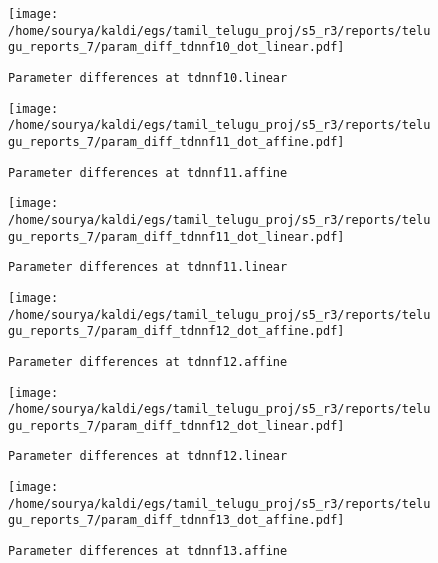 \documentclass[prl,10pt,twocolumn]{revtex4}
\begin{document}
\newpage
\begin{figure}[h]
  \begin{center}
    \caption{\texttt{Parameter differences at tdnnf10.linear}}
    \texttt{[image: /home/sourya/kaldi/egs/tamil\_telugu\_proj/s5\_r3/reports/telugu\_reports\_7/param\_diff\_tdnnf10\_dot\_linear.pdf]}
  \end{center}
\end{figure}
\clearpage


\newpage
\begin{figure}[h]
  \begin{center}
    \caption{\texttt{Parameter differences at tdnnf11.affine}}
    \texttt{[image: /home/sourya/kaldi/egs/tamil\_telugu\_proj/s5\_r3/reports/telugu\_reports\_7/param\_diff\_tdnnf11\_dot\_affine.pdf]}
  \end{center}
\end{figure}
\clearpage


\newpage
\begin{figure}[h]
  \begin{center}
    \caption{\texttt{Parameter differences at tdnnf11.linear}}
    \texttt{[image: /home/sourya/kaldi/egs/tamil\_telugu\_proj/s5\_r3/reports/telugu\_reports\_7/param\_diff\_tdnnf11\_dot\_linear.pdf]}
  \end{center}
\end{figure}
\clearpage


\newpage
\begin{figure}[h]
  \begin{center}
    \caption{\texttt{Parameter differences at tdnnf12.affine}}
    \texttt{[image: /home/sourya/kaldi/egs/tamil\_telugu\_proj/s5\_r3/reports/telugu\_reports\_7/param\_diff\_tdnnf12\_dot\_affine.pdf]}
  \end{center}
\end{figure}
\clearpage


\newpage
\begin{figure}[h]
  \begin{center}
    \caption{\texttt{Parameter differences at tdnnf12.linear}}
    \texttt{[image: /home/sourya/kaldi/egs/tamil\_telugu\_proj/s5\_r3/reports/telugu\_reports\_7/param\_diff\_tdnnf12\_dot\_linear.pdf]}
  \end{center}
\end{figure}
\clearpage


\newpage
\begin{figure}[h]
  \begin{center}
    \caption{\texttt{Parameter differences at tdnnf13.affine}}
    \texttt{[image: /home/sourya/kaldi/egs/tamil\_telugu\_proj/s5\_r3/reports/telugu\_reports\_7/param\_diff\_tdnnf13\_dot\_affine.pdf]}
  \end{center}
\end{figure}
\clearpage
\end{document}
